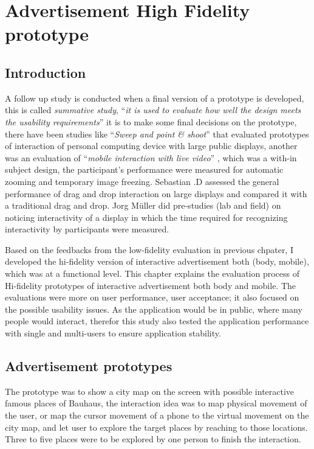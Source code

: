 \chapter{Advertisement High Fidelity prototype} %

\label{Chapter6} %

\newpage

\section{Introduction}
A follow up study is conducted when a final version of a prototype is developed, this is called \emph{summative study}, \cite{summative} ``\emph{it is used to evaluate how well the design meets the usability requirements}'' it is to make some final decisions on the prototype, there have been studies like ``\emph{Sweep and point \& shoot}'' \cite{SweepPointShoot} that evaluated prototypes of interaction of personal computing device with large public displays, another was an evaluation of ``\emph{mobile interaction with live video}'' \cite{TouchProjector}, which was a with-in subject design, the participant’s performance were measured for automatic zooming and temporary image freezing. Sebastian .D \cite{WalldragandDrop} assessed the general performance of drag and drop interaction on large displays and compared it with a traditional drag and drop. Jorg Müller \cite{LookingGlass} did pre-studies (lab and field) on noticing interactivity of a display in which the time required for recognizing interactivity by participants were measured.

Based on the feedbacks from the low-fidelity evaluation in previous chpater, I developed the hi-fidelity version of interactive advertisement both (body, mobile), which was at a functional level. This chapter explains the evaluation process of Hi-fidelity prototypes of interactive advertisement both body and mobile. The evaluations were more on user performance, user acceptance; it also focused on the possible usability issues. As the application would be in public, where many people would interact, therefor this study also tested the application performance with single and multi-users to ensure application stability.



\section{Advertisement prototypes}
The prototype was to show a city map on the screen with possible interactive famous places of Bauhaus, the interaction idea was to map physical movement of the user, or map the cursor movement of a phone to the virtual movement on the city map, and let user to explore the target places by reaching to those locations. Three to five places were to be explored by one person to finish the interaction.


